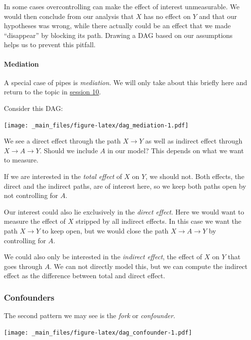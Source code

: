 \documentclass[
]{book}
\begin{document}
In some cases overcontrolling can make the effect of interest unmeasurable. We
would then conclude from our analysis that \(X\) has no effect on \(Y\) and that our
hypotheses was wrong, while there actually could be an effect that we made
``disappear'' by blocking its path. Drawing a DAG based on our assumptions helps
us to prevent this pitfall.

\hypertarget{mediation}{%
\paragraph{Mediation}\label{mediation}}

A special case of pipes is \emph{mediation}. We will only take about this briefly
here and return to the topic in \protect\hyperlink{med}{session 10}.

Consider this DAG:

\texttt{[image: \_main\_files/figure-latex/dag\_mediation-1.pdf]}

We see a direct effect through the path \(X \rightarrow Y\) as well as indirect
effect through \(X \rightarrow A \rightarrow Y\). Should we include \(A\) in our
model? This depends on what we want to measure.

If we are interested in the \emph{total effect} of \(X\) on \(Y\), we should not. Both
effects, the direct and the indirect paths, are of interest here, so we keep
both paths open by not controlling for \(A\).

Our interest could also lie exclusively in the \emph{direct effect}. Here we would
want to measure the effect of \(X\) stripped by all indirect effects. In this case
we want the path \(X \rightarrow Y\) to keep open, but we would close the path
\(X \rightarrow A \rightarrow Y\) by controlling for \(A\).

We could also only be interested in the \emph{indirect effect}, the effect
of \(X\) on \(Y\) that goes through \(A\). We can not directly model this, but we can
compute the indirect effect as the difference between total and direct effect.

\hypertarget{confounders}{%
\subsubsection{Confounders}\label{confounders}}

The second pattern we may see is the \emph{fork} or \emph{confounder}.

\texttt{[image: \_main\_files/figure-latex/dag\_confounder-1.pdf]}
\end{document}

